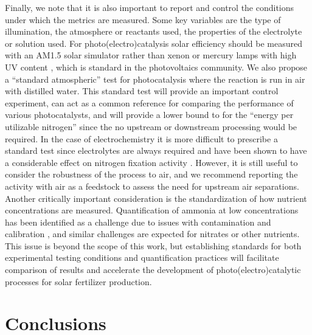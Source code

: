 Finally, we note that it is also important to report and control the conditions under which the metrics are measured. Some key variables are the type of illumination, the atmosphere or reactants used, the properties of the electrolyte or solution used. For photo(electro)catalysis solar efficiency should be measured with an AM1.5 solar simulator rather than xenon or mercury lamps with high UV content \cite{AM_1.5}, which is standard in the photovoltaics community. We also propose a ``standard atmospheric'' test for photocatalysis where the reaction is run in air with distilled water. This standard test will provide an important control experiment, can act as a common reference for comparing the performance of various photocatalysts, and will provide a lower bound to for the ``energy per utilizable nitrogen'' since the no upstream or downstream processing would be required. In the case of electrochemistry it is more difficult to prescribe a standard test since electrolytes are always required and have been shown to have a considerable effect on nitrogen fixation activity \cite{Song_2018,Zhou_2017,Sheets_2018,Cui_2018}. However, it is still useful to consider the robustness of the process to air, and we recommend reporting the activity with air as a feedstock to assess the need for upstream air separations. Another critically important consideration is the standardization of how nutrient concentrations are measured. Quantification of ammonia at low concentrations has been identified as a challenge due to issues with contamination and calibration \cite{Greenlee_2018,Gao_2018,Zhao_2019,Cui_2018}, and similar challenges are expected for nitrates or other nutrients. This issue is beyond the scope of this work, but establishing standards for both experimental testing conditions and quantification practices will facilitate comparison of results and accelerate the development of photo(electro)catalytic processes for solar fertilizer production.

\section{Conclusions}

